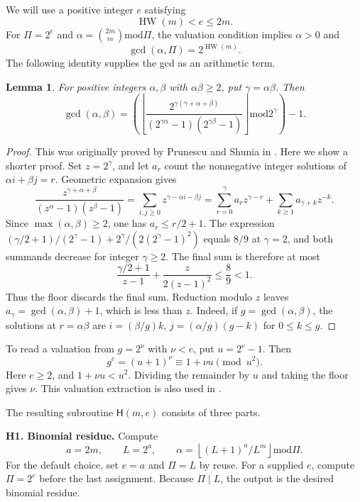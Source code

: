 \documentclass[11pt]{article}
\newtheorem{lemma}[theorem]{Lemma}
\theoremstyle{remark}
\newcommand{\md}{\mathbin{\mathrm{mod}}}
\newcommand{\fl}[1]{\left\lfloor #1\right\rfloor}
\newcommand{\HW}{\operatorname{HW}}
\begin{document}
We will use a positive integer $e$ satisfying
\begin{equation}\label{eq:e-condition}
  \HW(m)<e\le2m.
\end{equation}
For $\Pi=2^e$ and
$\alpha=\binom{2m}{m}\md\Pi$, the valuation condition implies
$\alpha>0$ and
\[
  \gcd(\alpha,\Pi)=2^{\HW(m)}.
\]
The following identity supplies the gcd as an arithmetic term.

\begin{lemma}\label{lem:gcd}
For positive integers $\alpha,\beta$ with $\alpha\beta\ge2$, put
$\gamma=\alpha\beta$. Then
\begin{equation}\label{eq:gcd}
  \gcd(\alpha,\beta)=
  \left(\fl{\frac{2^{\gamma(\gamma+\alpha+\beta)}}
  {(2^{\gamma\alpha}-1)(2^{\gamma\beta}-1)}}
  \md 2^\gamma\right)-1.
\end{equation}
\end{lemma}

\begin{proof} This was originally proved by Prunescu and Shunia in \cite{PSg24}. Here we show a shorter proof. 
Set $z=2^\gamma$, and let $a_r$ count the nonnegative integer
solutions of $\alpha i+\beta j=r$. Geometric expansion gives
\[
  \frac{z^{\gamma+\alpha+\beta}}
       {(z^\alpha-1)(z^\beta-1)}
  =\sum_{i,j\ge0}z^{\gamma-\alpha i-\beta j}
  =\sum_{r=0}^{\gamma}a_rz^{\gamma-r}
   +\sum_{k\ge1}a_{\gamma+k}z^{-k}.
\]
Since $\max(\alpha,\beta)\ge2$, one has $a_r\le r/2+1$.
The expression $(\gamma/2+1)/(2^\gamma-1)
+2^\gamma/(2(2^\gamma-1)^2)$ equals $8/9$ at $\gamma=2$,
and both summands decrease for integer $\gamma\ge2$.
The final sum is therefore at most
\[
  \frac{\gamma/2+1}{z-1}
   +\frac{z}{2(z-1)^2}\le\frac89<1.
\]
Thus the floor discards the final sum. Reduction modulo $z$
leaves $a_\gamma=\gcd(\alpha,\beta)+1$, which is less than $z$.
Indeed, if $g=\gcd(\alpha,\beta)$, the solutions at $r=\alpha\beta$
are $i=(\beta/g)k$, $j=(\alpha/g)(g-k)$ for $0\le k\le g$.
\end{proof}

To read a valuation from $g=2^\nu$ with $\nu<e$, put $u=2^e-1$.
Then
\[
  g^e=(u+1)^\nu\equiv1+\nu u\pmod{u^2}.
\]
Here $e\ge2$, and $1+\nu u<u^2$. Dividing the remainder by
$u$ and taking the floor gives $\nu$.
This valuation extraction is also used in \cite{Mazzanti,Marchenkov}.

The resulting subroutine $\mathsf H(m,e)$ consists of three parts.

\textbf{H1. Binomial residue.} Compute
\[
  a=2m,\qquad L=2^{a},\qquad
  \alpha=\fl{(L+1)^{a}/L^m}\md\Pi.
\]
For the default choice, set $e=a$ and $\Pi=L$ by reuse.
For a supplied $e$, compute $\Pi=2^e$ before the last assignment.
Because $\Pi\mid L$, the output is the desired binomial residue.
\end{document}
